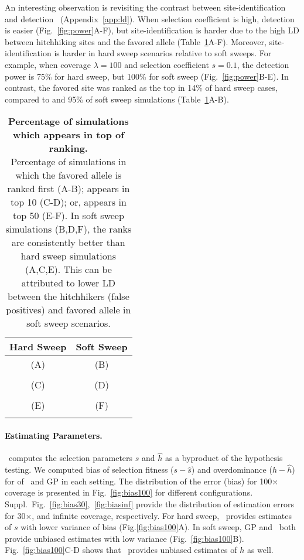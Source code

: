 An interesting observation is revisiting the contrast between 
site-identification
and detection~\cite{long2013massive,tobler2014massive} (Appendix~\ref{app:ld}). 
When selection 
coefficient is high, detection is easier
(Fig.~\ref{fig:power}A-F), but site-identification is harder due to
the high LD between hitchhiking sites and the favored allele
(Table~\ref{tab:rank}A-F).  Moreover, site-identification is harder in
hard sweep scenarios relative to soft sweeps. For example, when
coverage $\lambda=100$ and selection coefficient $s=0.1$, the
detection power is 75\% for hard sweep, but 100\% for soft sweep
(Fig.~\ref{fig:power}B-E). In contrast, the favored site was ranked as
the top in 14\% of hard sweep cases, compared to and 95\% of soft
sweep simulations (Table~\ref{tab:rank}A-B).  

\newcommand*\rot{\rotatebox{-90} }
\begin{table}[H]
	\centering
	\begin{tabular}{c||c}
		 Hard Sweep &Soft Sweep\\
		\hline
		(A) & (B)  \\
		{}
		 &{ }\\
		\hline
		(C)  & (D)  \\
		{}
		& { }\\
		\hline
		(E) & (F) \\
		{}
		&{ }\\
		\hline
	\end{tabular}
	\caption{{\bf Percentage of simulations which appears in top of ranking.}\\
		Percentage of simulations in which the favored allele is ranked 
	first 
		(A-B); 
		appears in top 10 (C-D); or,  appears in top 50 (E-F). In soft sweep 
		simulations (B,D,F), the ranks are consistently better than 
		hard sweep simulations (A,C,E). This can be attributed to lower LD 
		between the 
		hitchhikers (false positives) and favored allele in soft sweep 
		scenarios.}\label{tab:rank}
\end{table}
 
\paragraph{Estimating Parameters.}
\comale\ computes the selection parameters $\hat{s}$ and $\hat{h}$ as
a byproduct of the hypothesis testing. We computed bias of selection
fitness ($s-\hat{s}$) and overdominance ($h-\hat{h}$) for of \comale\
and GP in each setting. The distribution of the error (bias) for
100$\times$ coverage is presented in Fig.~\ref{fig:bias100} for
different configurations.
Suppl.~Fig.~\ref{fig:bias30},~\ref{fig:biasinf} provide the
distribution of estimation errors for 30$\times$, and infinite
coverage, respectively.  For hard sweep, \comale\ provides estimates
of $s$ with lower variance of bias (Fig.\ref{fig:bias100}A). In soft
sweep, GP and \comale\ both provide unbiased estimates with low
variance (Fig.~\ref{fig:bias100}B). Fig.~\ref{fig:bias100}C-D shows
that \comale\ provides unbiased estimates of $h$ as well.


